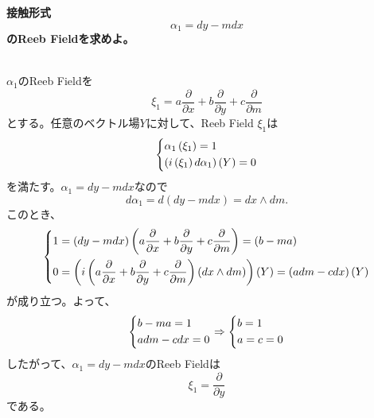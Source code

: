 \documentclass[../main]{subfiles}
\begin{document}
\textbf{接触形式$${\alpha _1} = dy - mdx$$のReeb Fieldを求めよ。}
\\\\
\par ${\alpha _1}$のReeb Fieldを$${\xi _1} = a\frac{\partial }{{\partial x}} + b\frac{\partial }{{\partial y}} + c\frac{\partial }{{\partial m}}$$とする。任意のベクトル場$Y$に対して、Reeb Field ${\xi _1}$は$$\left\{ \begin{gathered}
  {\alpha _1}\left( {\xi _1} \right) = 1 \hfill \\
  \left( {i\left( {{\xi _1}} \right)d{\alpha _1}} \right)\left( Y \right) = 0 \hfill \\ 
\end{gathered}  \right.$$を満たす。${\alpha _1} = dy - mdx$なので\[d{\alpha _1} = d\left( {dy - mdx} \right) = dx \wedge dm.\]このとき、
\[\left\{ \begin{gathered}
  1 = \left( {dy - mdx} \right)\left( {a\frac{\partial }{{\partial x}} + b\frac{\partial }{{\partial y}} + c\frac{\partial }{\partial m}} \right) = \left( {b - ma} \right) \hfill \\
  0 = \left( {i\left( {a\frac{\partial }{{\partial x}} + b\frac{\partial }{{\partial y}} + c\frac{\partial }{{\partial m}}} \right)\left( {dx \wedge dm} \right)} \right)\left( Y \right) = \left( {adm - cdx} \right)\left( Y \right) \hfill \\ 
\end{gathered}  \right.\]が成り立つ。よって、\[\left\{ \begin{gathered}
  b - ma = 1 \hfill \\
  adm - cdx = 0 \hfill \\ 
\end{gathered}  \right. \Rightarrow \left\{ \begin{gathered}
  b = 1 \hfill \\
  a = c = 0 \hfill \\ 
\end{gathered}  \right.\]したがって、${\alpha _1} = dy - mdx$のReeb Fieldは\[{\xi _1} = \frac{\partial }{{\partial y}}\]である。
\end{document}
